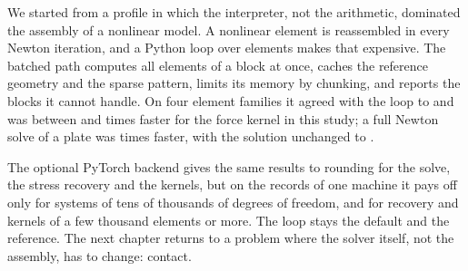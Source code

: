 We started from a profile in which the interpreter, not the arithmetic, dominated the assembly of a nonlinear model. A nonlinear element is reassembled in every Newton iteration, and a Python loop over elements makes that expensive. The batched path computes all elements of a block at once, caches the reference geometry and the sparse pattern, limits its memory by chunking, and reports the blocks it cannot handle. On four element families it agreed with the loop to \cbkAgreeWorst{} and was between \cbkKFHexTwenty{} and \cbkKFQuad{} times faster for the force kernel in this study; a full Newton solve of a plate was \cbkNewtonRatio{} times faster, with the solution unchanged to \cbkNewtonDiff.

The optional PyTorch backend gives the same results to rounding for the solve, the stress recovery and the kernels, but on the records of one machine it pays off only for systems of tens of thousands of degrees of freedom, and for recovery and kernels of a few thousand elements or more. The loop stays the default and the reference. The next chapter returns to a problem where the solver itself, not the assembly, has to change: contact.

